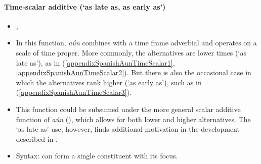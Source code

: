 \paragraph{Time-scalar additive (\lq as late as, as early as\rq{})}\label{appendixSpanishAunTimeScalar}
\begin{itemize}
	\item \textcite{Trujillo1990}, 
	\item In this function, \textit{\textit{aún}} combines with a time frame adverbial and operates on a scale of time proper. More commonly, the alternatives are lower times (\lq as late as\rq{}), as in (\ref{appendixSpanishAunTimeScalar1}, \ref{appendixSpanishAunTimeScalar2}). But there is also the occasional case in which the alternatives rank higher (\lq as early as\rq{}), such as in (\ref{appendixSpanishAunTimeScalar3}).
	\item This function could be subsumed under the more general scalar additive function of \textit{aún} (), which allows for both lower and higher alternatives. The \lq as late as\rq{ }use, however, finds additional motivation in the development described in .
	\item Syntax: can form a single constituent with its focus.
\end{itemize}

